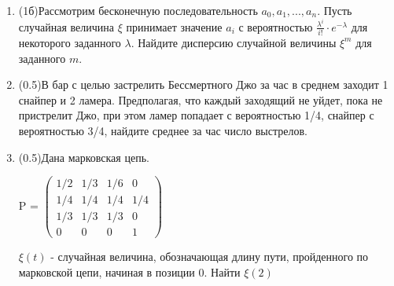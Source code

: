 \documentclass[a4paper, 14pt]{extarticle}
\begin{document}
\begin{enumerate}
\item (1б)Рассмотрим бесконечную последовательность $a_0, a_1, ..., a_n$. Пусть случайная величина $\xi$ принимает значение $a_i$ с вероятностью $\frac{\lambda^i}{i!} \cdot e^{-\lambda}$ для некоторого заданного $\lambda$. Найдите дисперсию случайной величины $\xi^m$ для заданного $m$.

\item (0.5)В бар с целью застрелить Бессмертного Джо
за час в среднем заходит 1 снайпер и 2 ламера. Предполагая, что
каждый заходящий не уйдет, пока не пристрелит Джо, при этом ламер
попадает с вероятностью 1/4, снайпер  с вероятностью 3/4, найдите
среднее за час число выстрелов.

\item (0.5)Дана марковская цепь. 
\begin{center}
    P = $\left ( \begin{array}{cccc}
        1/2 & 1/3 & 1/6 & 0 \\
        1/4 & 1/4 & 1/4 & 1/4\\
        1/3 & 1/3 & 1/3 & 0\\
        0 & 0 & 0 & 1
    \end{array} \right )$
\end{center}
$\xi(t)$ - случайная величина, обозначающая длину пути, пройденного по марковской цепи, начиная в позиции 0. Найти $\xi(2)$


\end{enumerate}
\end{document}
